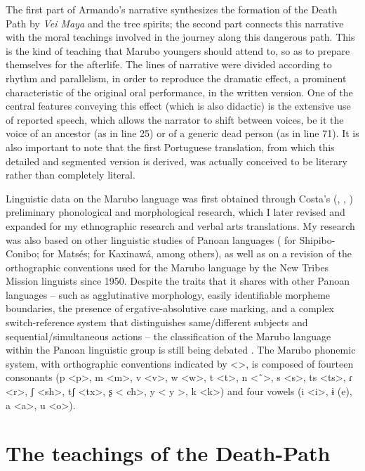 \documentclass[output=paper,
modfonts,nonflat
]{langsci/langscibook}
\begin{document}
The first part of Armando's narrative synthesizes the formation of the Death Path by \textit{Vei Maya} and the tree spirits; the second part connects this narrative with the moral teachings involved in the journey along this dangerous path. This is the kind of teaching that Marubo youngers should attend to, so as to prepare themselves for the afterlife. The lines of narrative were divided according to rhythm and parallelism, in order to reproduce the dramatic effect, a prominent characteristic of the original oral performance, in the written version. One of the central features conveying this effect (which is also didactic) is the extensive use of reported speech, which allows the narrator to shift between voices, be it the voice of an ancestor (as in line 25) or of a generic dead person (as in line 71). It is also important to note that the first Portuguese translation, from which this detailed and segmented version is derived, was actually conceived to be literary rather than completely literal.

Linguistic data on the Marubo language was first obtained through Costa's (\citeyear{Costa1992}, \citeyear{Costa1998}, \citeyear{Costa2000}) preliminary phonological and morphological research, which I later revised and expanded for my ethnographic research and verbal arts translations. My research was also based on other linguistic studies of Panoan languages (\citealt{Valenzuela2003} for Shipibo-Conibo; \citealt{Fleck2003} for Matsés; \citealt{Camargo1995,Camargo1996a,Camargo1996b,Camargo1998,Camargo2003,Camargo2005} for Kaxinawá, among others), as well as on a revision of the orthographic conventions used for the Marubo language by the New Tribes Mission linguists since 1950. Despite the traits that it shares with other Panoan languages -- such as agglutinative morphology, easily identifiable morpheme boundaries, the presence of ergative-absolutive case marking, and a complex switch-reference system that distinguishes same/different subjects and sequential/simultaneous actions -- the classification of the Marubo language within the Panoan linguistic group is still being debated \citep[55]
{Valenzuela2003}. The Marubo phonemic system, with orthographic conventions indicated by <>, is composed of fourteen consonants (p <p>, m <m>, v <v>, w <w>, t <t>, n <˜>, s <s>, ts <ts>, ɾ <r>, ʃ <sh>, tʃ <tx>, ʂ < ch>, y < y >, k <k>) and four vowels (i <i>, ɨ (e), a <a>, u <o>).

      \section{The teachings of the Death-Path}
\end{document}
